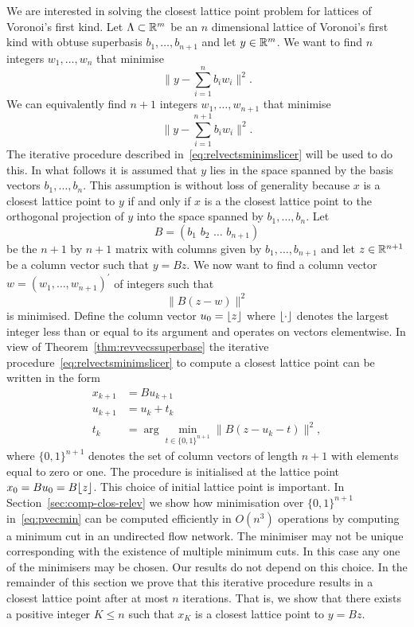 \documentclass[final,leqno]{siamltex}
\begin{document}
We are interested in solving the closest lattice point problem for lattices of Voronoi's first kind.  Let $\Lambda \subset {\mathbb R}^m$ be an $n$ dimensional lattice of Voronoi's first kind with obtuse superbasis $b_1,\dots,b_{n+1}$ and let $y \in {\mathbb R}^m$.  We want to find $n$ integers $w_1,\dots,w_n$ that minimise
\[
\| y - \sum_{i=1}^n b_i w_i \|^2.
\]
We can equivalently find $n+1$ integers $w_1,\dots,w_{n+1}$ that minimise
\[
\| y - \sum_{i=1}^{n+1} b_i w_i \|^2.
\]
The iterative procedure described in~\eqref{eq:relvectsminimslicer} will be used to do this.  In what follows it is assumed that $y$ lies in the space spanned by the basis vectors $b_1,\dots,b_{n}$.  This assumption is without loss of generality because $x$ is a closest lattice point to $y$ if and only if $x$ is a the closest lattice point to the orthogonal projection of $y$ into the space spanned by $b_1,\dots,b_{n}$.  Let
\begin{equation}\label{eq:matrxBobtusebasis}
B = (b_1\,\,b_2\,\,\dots\,\,b_{n+1})
\end{equation}
be the $n+1$ by $n+1$ matrix with columns given by $b_1,\dots,b_{n+1}$ and let $z \in {\mathbb R}^{n+1}$ be a column vector such that $y = Bz$.  We now want to find a column vector $w = (w_1,\dots,w_{n+1})^\prime$ of integers such that
\begin{equation}\label{eq:tominimise}
\| B(z  -  w) \|^2
\end{equation}
is minimised.  Define the column vector $u_0 = {\left\lfloor z \right\rfloor}$ where ${\left\lfloor \cdot \right\rfloor}$ denotes the largest integer less than or equal to its argument and operates on vectors elementwise. In view of Theorem~\ref{thm:revvecssuperbase} the iterative procedure~\eqref{eq:relvectsminimslicer} to compute a closest lattice point can be written in the form
\begin{align}
x_{k+1} &= B u_{k+1} \label{eq:xseqfirsttype}  \\
u_{k+1} &= u_k + t_k \nonumber \\
t_k &= \arg\min_{t \in \{0,1\}^{n+1}}\| B(z - u_k - t) \|^2, \label{eq:pvecmin}
\end{align}
where $\{0,1\}^{n+1}$ denotes the set of column vectors of length $n+1$ with elements equal to zero or one.  The procedure is initialised at the lattice point $x_0 = Bu_0 = B{\left\lfloor z \right\rfloor}$.  This choice of initial lattice point is important.  In Section~\ref{sec:comp-clos-relev} we show how minimisation over $\{0,1\}^{n+1}$ in~\eqref{eq:pvecmin} can be computed efficiently in $O(n^3)$ operations by computing a minimum cut in an undirected flow network.  The minimiser may not be unique corresponding with the existence of multiple minimum cuts.  In this case any one of the minimisers may be chosen.  Our results do not depend on this choice.   In the remainder of this section we prove that this iterative procedure results in a closest lattice point after at most $n$ iterations.  That is, we show that there exists a positive integer $K \leq n$ such that $x_K$ is a closest lattice point to $y = Bz$.
\end{document}
